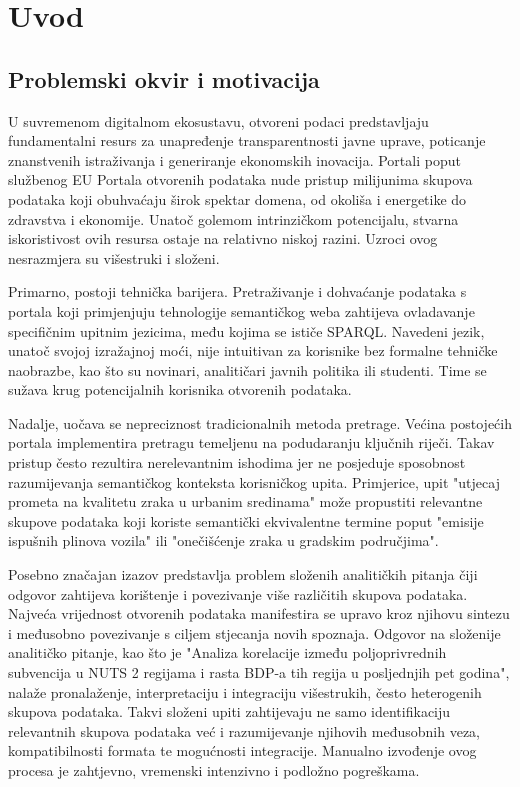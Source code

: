\chapter{Uvod}
\label{ch:introduction_background}


\section{Problemski okvir i motivacija}

U suvremenom digitalnom ekosustavu, otvoreni podaci predstavljaju fundamentalni resurs za unapređenje transparentnosti javne uprave, poticanje znanstvenih istraživanja i generiranje ekonomskih inovacija. Portali poput službenog EU Portala otvorenih podataka nude pristup milijunima skupova podataka koji obuhvaćaju širok spektar domena, od okoliša i energetike do zdravstva i ekonomije. Unatoč golemom intrinzičkom potencijalu, stvarna iskoristivost ovih resursa ostaje na relativno niskoj razini. Uzroci ovog nesrazmjera su višestruki i složeni.

Primarno, postoji tehnička barijera. Pretraživanje i dohvaćanje podataka s portala koji primjenjuju tehnologije semantičkog weba zahtijeva ovladavanje specifičnim upitnim jezicima, među kojima se ističe SPARQL. Navedeni jezik, unatoč svojoj izražajnoj moći, nije intuitivan za korisnike bez formalne tehničke naobrazbe, kao što su novinari, analitičari javnih politika ili studenti. Time se sužava krug potencijalnih korisnika otvorenih podataka.

Nadalje, uočava se nepreciznost tradicionalnih metoda pretrage. Većina postojećih portala implementira pretragu temeljenu na podudaranju ključnih riječi. Takav pristup često rezultira nerelevantnim ishodima jer ne posjeduje sposobnost razumijevanja semantičkog konteksta korisničkog upita. Primjerice, upit "utjecaj prometa na kvalitetu zraka u urbanim sredinama" može propustiti relevantne skupove podataka koji koriste semantički ekvivalentne termine poput "emisije ispušnih plinova vozila" ili "onečišćenje zraka u gradskim područjima".

Posebno značajan izazov predstavlja problem složenih analitičkih pitanja čiji odgovor zahtijeva korištenje i povezivanje više različitih skupova podataka. Najveća vrijednost otvorenih podataka manifestira se upravo kroz njihovu sintezu i međusobno povezivanje s ciljem stjecanja novih spoznaja. Odgovor na složenije analitičko pitanje, kao što je "Analiza korelacije između poljoprivrednih subvencija u NUTS 2 regijama i rasta BDP-a tih regija u posljednjih pet godina", nalaže pronalaženje, interpretaciju i integraciju višestrukih, često heterogenih skupova podataka. Takvi složeni upiti zahtijevaju ne samo identifikaciju relevantnih skupova podataka već i razumijevanje njihovih međusobnih veza, kompatibilnosti formata te mogućnosti integracije. Manualno izvođenje ovog procesa je zahtjevno, vremenski intenzivno i podložno pogreškama.

